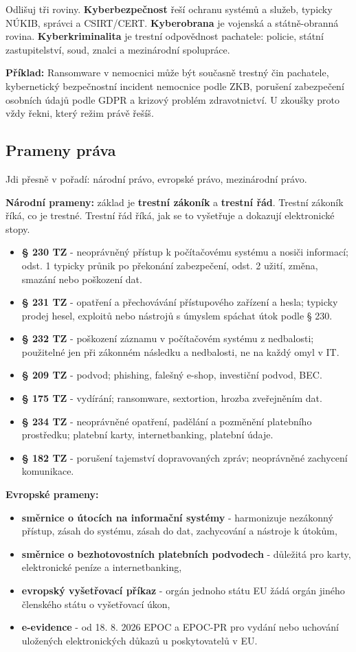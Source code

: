 \documentclass[11pt,a4paper]{article}
\newcommand{\priklad}[1]{\begin{tcolorbox}[breakable,enhanced,colback=green!7,colframe=green!30!black,boxrule=0pt,arc=1mm,left=5pt,right=5pt,top=5pt,bottom=5pt,before skip=6pt,after skip=6pt]\textbf{Příklad:} #1\end{tcolorbox}}
\begin{document}
Odlišuj tři roviny. \textbf{Kyberbezpečnost} řeší ochranu systémů a služeb, typicky NÚKIB, správci a CSIRT/CERT. \textbf{Kyberobrana} je vojenská a státně-obranná rovina. \textbf{Kyberkriminalita} je trestní odpovědnost pachatele: policie, státní zastupitelství, soud, znalci a mezinárodní spolupráce.

\priklad{Ransomware v nemocnici může být současně trestný čin pachatele, kybernetický bezpečnostní incident nemocnice podle ZKB, porušení zabezpečení osobních údajů podle GDPR a krizový problém zdravotnictví. U zkoušky proto vždy řekni, který režim právě řešíš.}

\subsection*{Prameny práva}
Jdi přesně v pořadí: národní právo, evropské právo, mezinárodní právo.

\textbf{Národní prameny:} základ je \textbf{trestní zákoník} a \textbf{trestní řád}. Trestní zákoník říká, co je trestné. Trestní řád říká, jak se to vyšetřuje a dokazují elektronické stopy.
\begin{itemize}
  \item \textbf{§ 230 TZ} - neoprávněný přístup k počítačovému systému a nosiči informací; odst. 1 typicky průnik po překonání zabezpečení, odst. 2 užití, změna, smazání nebo poškození dat.
  \item \textbf{§ 231 TZ} - opatření a přechovávání přístupového zařízení a hesla; typicky prodej hesel, exploitů nebo nástrojů s úmyslem spáchat útok podle § 230.
  \item \textbf{§ 232 TZ} - poškození záznamu v počítačovém systému z nedbalosti; použitelné jen při zákonném následku a nedbalosti, ne na každý omyl v IT.
  \item \textbf{§ 209 TZ} - podvod; phishing, falešný e-shop, investiční podvod, BEC.
  \item \textbf{§ 175 TZ} - vydírání; ransomware, sextortion, hrozba zveřejněním dat.
  \item \textbf{§ 234 TZ} - neoprávněné opatření, padělání a pozměnění platebního prostředku; platební karty, internetbanking, platební údaje.
  \item \textbf{§ 182 TZ} - porušení tajemství dopravovaných zpráv; neoprávněné zachycení komunikace.
\end{itemize}

\textbf{Evropské prameny:}
\begin{itemize}
  \item \textbf{směrnice o útocích na informační systémy} - harmonizuje nezákonný přístup, zásah do systému, zásah do dat, zachycování a nástroje k útokům,
  \item \textbf{směrnice o bezhotovostních platebních podvodech} - důležitá pro karty, elektronické peníze a internetbanking,
  \item \textbf{evropský vyšetřovací příkaz} - orgán jednoho státu EU žádá orgán jiného členského státu o vyšetřovací úkon,
  \item \textbf{e-evidence} - od 18. 8. 2026 EPOC a EPOC-PR pro vydání nebo uchování uložených elektronických důkazů u poskytovatelů v EU.
\end{itemize}
\end{document}
